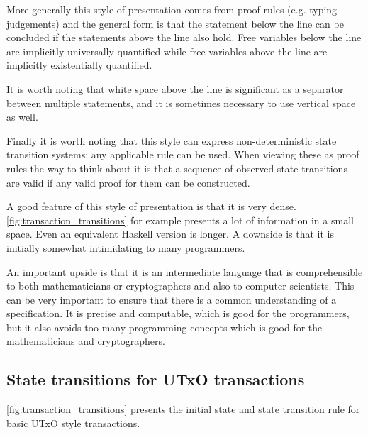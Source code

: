 \documentclass[11pt,a4paper]{article}
\begin{document}
More generally this style of presentation comes from proof rules (e.g. typing
judgements) and the general form is that the statement below the line can be
concluded if the statements above the line also hold. Free variables below the
line are implicitly universally quantified while free variables above the line
are implicitly existentially quantified.

It is worth noting that white space above the line is significant as a
separator between multiple statements, and it is sometimes necessary to use
vertical space as well.

Finally it is worth noting that this style can express non-deterministic
state transition systems: any applicable rule can be used. When viewing these
as proof rules the way to think about it is that a sequence of observed state
transitions are valid if any valid proof for them can be constructed.

A good feature of this style of presentation is that it is very dense.
\cref{fig:transaction_transitions} for example presents a lot of information in
a small space. Even an equivalent Haskell version is longer. A downside is that
it is initially somewhat intimidating to many programmers.

An important upside is that it is an intermediate language that is
comprehensible to both mathematicians or cryptographers and also to computer
scientists. This can be very important to ensure that there is a common
understanding of a specification. It is precise and computable, which is good
for the programmers, but it also avoids too many programming concepts which is
good for the mathematicians and cryptographers.

\subsection{State transitions for UTxO transactions}

\cref{fig:transaction_transitions} presents the initial state and state
transition rule for basic UTxO style transactions.
\end{document}
